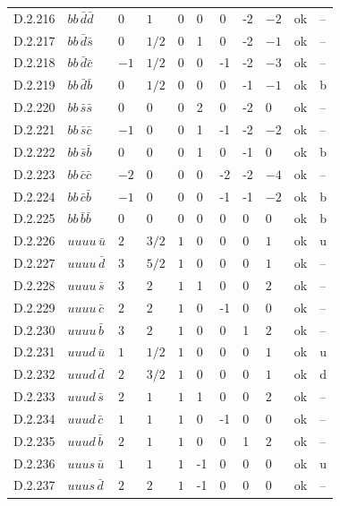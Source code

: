 {\begin{longtable}{@{}llllllllll>{\raggedright\arraybackslash}p{2.0cm}@{}}
D.2.216 & $bb\,\bar{d}\bar{d}$ & $0$ & $1$ & $0$ & 0 & 0 & -2 & $-2$ & ok & -- \\
D.2.217 & $bb\,\bar{d}\bar{s}$ & $0$ & $1/2$ & $0$ & 1 & 0 & -2 & $-1$ & ok & -- \\
D.2.218 & $bb\,\bar{d}\bar{c}$ & $-1$ & $1/2$ & $0$ & 0 & -1 & -2 & $-3$ & ok & -- \\
D.2.219 & $bb\,\bar{d}\bar{b}$ & $0$ & $1/2$ & $0$ & 0 & 0 & -1 & $-1$ & ok & b \\
D.2.220 & $bb\,\bar{s}\bar{s}$ & $0$ & $0$ & $0$ & 2 & 0 & -2 & $0$ & ok & -- \\
D.2.221 & $bb\,\bar{s}\bar{c}$ & $-1$ & $0$ & $0$ & 1 & -1 & -2 & $-2$ & ok & -- \\
D.2.222 & $bb\,\bar{s}\bar{b}$ & $0$ & $0$ & $0$ & 1 & 0 & -1 & $0$ & ok & b \\
D.2.223 & $bb\,\bar{c}\bar{c}$ & $-2$ & $0$ & $0$ & 0 & -2 & -2 & $-4$ & ok & -- \\
D.2.224 & $bb\,\bar{c}\bar{b}$ & $-1$ & $0$ & $0$ & 0 & -1 & -1 & $-2$ & ok & b \\
D.2.225 & $bb\,\bar{b}\bar{b}$ & $0$ & $0$ & $0$ & 0 & 0 & 0 & $0$ & ok & b \\
D.2.226 & $uuuu\,\bar{u}$ & $2$ & $3/2$ & $1$ & 0 & 0 & 0 & $1$ & ok & u \\
D.2.227 & $uuuu\,\bar{d}$ & $3$ & $5/2$ & $1$ & 0 & 0 & 0 & $1$ & ok & -- \\
D.2.228 & $uuuu\,\bar{s}$ & $3$ & $2$ & $1$ & 1 & 0 & 0 & $2$ & ok & -- \\
D.2.229 & $uuuu\,\bar{c}$ & $2$ & $2$ & $1$ & 0 & -1 & 0 & $0$ & ok & -- \\
D.2.230 & $uuuu\,\bar{b}$ & $3$ & $2$ & $1$ & 0 & 0 & 1 & $2$ & ok & -- \\
D.2.231 & $uuud\,\bar{u}$ & $1$ & $1/2$ & $1$ & 0 & 0 & 0 & $1$ & ok & u \\
D.2.232 & $uuud\,\bar{d}$ & $2$ & $3/2$ & $1$ & 0 & 0 & 0 & $1$ & ok & d \\
D.2.233 & $uuud\,\bar{s}$ & $2$ & $1$ & $1$ & 1 & 0 & 0 & $2$ & ok & -- \\
D.2.234 & $uuud\,\bar{c}$ & $1$ & $1$ & $1$ & 0 & -1 & 0 & $0$ & ok & -- \\
D.2.235 & $uuud\,\bar{b}$ & $2$ & $1$ & $1$ & 0 & 0 & 1 & $2$ & ok & -- \\
D.2.236 & $uuus\,\bar{u}$ & $1$ & $1$ & $1$ & -1 & 0 & 0 & $0$ & ok & u \\
D.2.237 & $uuus\,\bar{d}$ & $2$ & $2$ & $1$ & -1 & 0 & 0 & $0$ & ok & -- \\

\end{longtable}}
